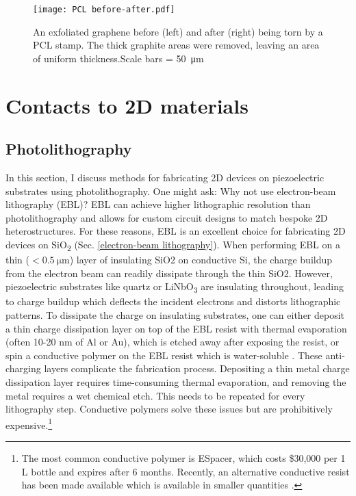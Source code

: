 \documentclass[double,12pt,1in,seploa]{beavtex}
\let\Oldsection\section
\renewcommand{\section}{\FloatBarrier\Oldsection}
\let\Oldsubsection\subsection
\renewcommand{\subsection}{\FloatBarrier\Oldsubsection}
\begin{document}
\begin{figure}
    \texttt{[image: PCL before-after.pdf]}
    \caption{An exfoliated graphene before (left) and after (right) being torn by a PCL stamp. The thick graphite areas were removed, leaving an area of uniform thickness.Scale bars = \SI{50}{\micro\meter}}
\end{figure}





\section{Contacts to 2D materials} \label{contacts to 2D materials}

\subsection{Photolithography} \label{photolithography}

In this section, I discuss methods for fabricating 2D devices on piezoelectric substrates using photolithography. One might ask: Why not use electron-beam lithography (EBL)? EBL can achieve higher lithographic resolution than photolithography and allows for custom circuit designs to match bespoke 2D heterostructures. For these reasons, EBL is an excellent choice for fabricating 2D devices on SiO\textsubscript{2} (Sec. \ref{electron-beam lithography}). When performing EBL on a thin ($< \SI{0.5}{\micro\meter}$) layer of insulating SiO2 on conductive Si, the charge buildup from the electron beam can readily dissipate through the thin SiO2. However, piezoelectric substrates like quartz or LiNbO\textsubscript{3} are insulating throughout, leading to charge buildup which deflects the incident electrons and distorts lithographic patterns. To dissipate the charge on insulating substrates, one can either deposit a thin charge dissipation layer on top of the EBL resist with thermal evaporation (often 10-20 nm of Al or Au), which is etched away after exposing the resist, or spin a conductive polymer on the EBL resist which is water-soluble \cite{noauthor_nanolithography_nodate}. These anti-charging layers complicate the fabrication process. Depositing a thin metal charge dissipation layer requires time-consuming thermal evaporation, and removing the metal requires a wet chemical etch. This needs to be repeated for every lithography step. Conductive polymers solve these issues but are prohibitively expensive.\footnote{The most common conductive polymer is ESpacer, which costs \$30,000 per 1 L bottle and expires after 6 months. Recently, an alternative conductive resist has been made available which is available in smaller quantities \cite{lopez_charge_2019}.}  
\end{document}
